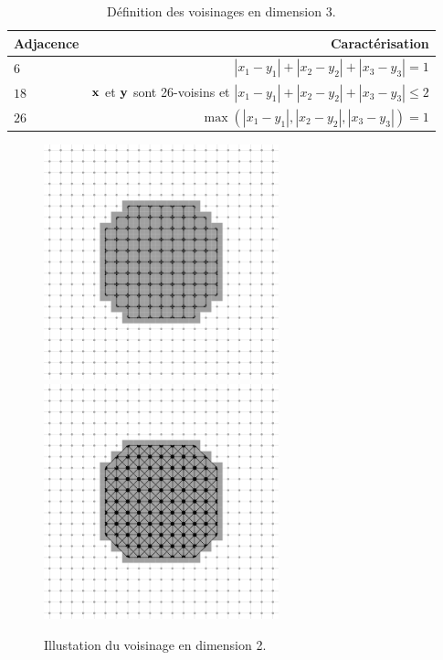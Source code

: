 \begin{table}[ht]
  \centering
  \caption{Définition des voisinages en dimension $3$.}
  \label{tab:adjacence3d}
    \renewcommand{\arraystretch}{1.1}
  \begin{tabular}{@{}lr@{}}
    \toprule
    Adjacence  & Caractérisation \\ \midrule
    $6$        & $|x_1 - y_1| + |x_2 - y_2| + |x_3 - y_3| = 1$ \\
    $18$       & $\mathbf{x}$ et $\mathbf{y}$ sont 26-voisins et $|x_1 - y_1| + |x_2 - y_2| + |x_3 - y_3| \le 2$ \\
    $26$       & $\max(|x_1 - y_1|,|x_2 - y_2|,|x_3 - y_3|) = 1$ \\
    \bottomrule
  \end{tabular}
\end{table}

\begin{figure}[ht]
  \begin{center}
    \includegraphics[width=6.8cm]{images/Notions/DiskWithAdj4}
    \includegraphics[width=6.8cm]{images/Notions/DiskWithAdj8}
    \caption[]{Illustation du voisinage en dimension 2.\label{fig:adjacence2d}}
  \end{center}
\end{figure}
%
